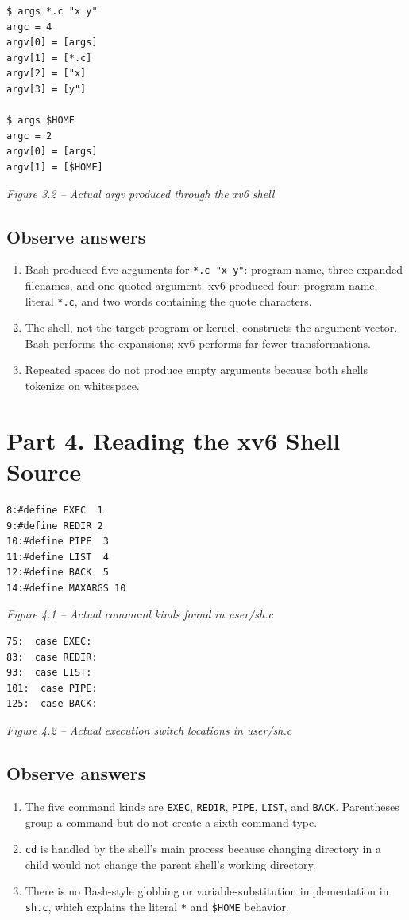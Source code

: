 \documentclass[12pt,a4paper]{article}
\newcommand{\figcap}[1]{\begin{center}\small\textit{#1}\end{center}\vspace{0.4em}}
\begin{document}
\begin{lstlisting}
$ args *.c "x y"
argc = 4
argv[0] = [args]
argv[1] = [*.c]
argv[2] = ["x]
argv[3] = [y"]

$ args $HOME
argc = 2
argv[0] = [args]
argv[1] = [$HOME]
\end{lstlisting}
\figcap{Figure 3.2 -- Actual argv produced through the xv6 shell}

\subsection{Observe answers}
\begin{enumerate}[label=\arabic*.]
\item Bash produced five arguments for \texttt{*.c "x y"}: program name, three expanded filenames, and one quoted argument. xv6 produced four: program name, literal \texttt{*.c}, and two words containing the quote characters.
\item The shell, not the target program or kernel, constructs the argument vector. Bash performs the expansions; xv6 performs far fewer transformations.
\item Repeated spaces do not produce empty arguments because both shells tokenize on whitespace.
\end{enumerate}

\section{Part 4. Reading the xv6 Shell Source}
\begin{lstlisting}
8:#define EXEC  1
9:#define REDIR 2
10:#define PIPE  3
11:#define LIST  4
12:#define BACK  5
14:#define MAXARGS 10
\end{lstlisting}
\figcap{Figure 4.1 -- Actual command kinds found in user/sh.c}

\begin{lstlisting}
75:  case EXEC:
83:  case REDIR:
93:  case LIST:
101:  case PIPE:
125:  case BACK:
\end{lstlisting}
\figcap{Figure 4.2 -- Actual execution switch locations in user/sh.c}

\subsection{Observe answers}
\begin{enumerate}[label=\arabic*.]
\item The five command kinds are \texttt{EXEC}, \texttt{REDIR}, \texttt{PIPE}, \texttt{LIST}, and \texttt{BACK}. Parentheses group a command but do not create a sixth command type.
\item \texttt{cd} is handled by the shell's main process because changing directory in a child would not change the parent shell's working directory.
\item There is no Bash-style globbing or variable-substitution implementation in \texttt{sh.c}, which explains the literal \texttt{*} and \texttt{\$HOME} behavior.
\end{enumerate}
\end{document}
